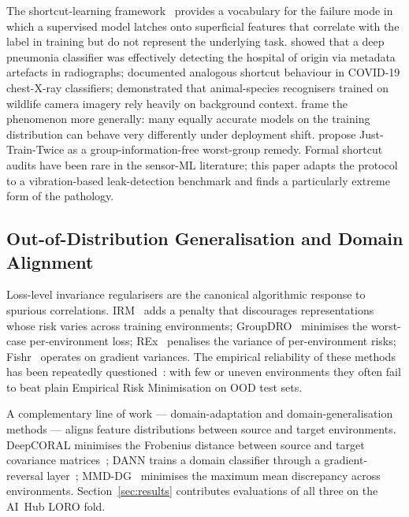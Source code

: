 \documentclass[3p,times,authoryear]{elsarticle}
\theoremstyle{remark}
\begin{document}
The shortcut-learning framework~\cite{geirhos2020shortcut}
provides a vocabulary for the failure mode in which a supervised
model latches onto superficial features that correlate with the
label in training but do not represent the underlying task.
\citet{zech2018pneumonia} showed that a deep pneumonia
classifier was effectively detecting the hospital of origin via
metadata artefacts in radiographs;
\citet{degrave2021covid} documented analogous shortcut behaviour
in COVID-19 chest-X-ray classifiers; \citet{beery2018terra}
demonstrated that animal-species recognisers trained on wildlife
camera imagery rely heavily on background context.
\citet{damour2022underspec} frame the phenomenon more generally:
many equally accurate models on the training distribution can
behave very differently under deployment shift.
\citet{liu2021jtt} propose Just-Train-Twice as a
group-information-free worst-group remedy. Formal shortcut
audits have been rare in the sensor-ML literature; this paper
adapts the protocol to a vibration-based leak-detection
benchmark and finds a particularly extreme form of the
pathology.

\subsection{Out-of-Distribution Generalisation and Domain Alignment}

Loss-level invariance regularisers are the canonical algorithmic
response to spurious correlations.
IRM~\cite{arjovsky2019irm} adds a penalty that discourages
representations whose risk varies across training environments;
GroupDRO~\cite{sagawa2020groupdro} minimises the worst-case
per-environment loss; REx~\cite{krueger2021rex} penalises the
variance of per-environment risks; Fishr~\cite{rame2022fishr}
operates on gradient variances. The empirical reliability of
these methods has been repeatedly
questioned~\cite{gulrajani2021dg,rosenfeld2021irm}: with few
or uneven environments they often fail to beat plain Empirical
Risk Minimisation on OOD test sets.

A complementary line of work --- domain-adaptation and
domain-generalisation methods --- aligns feature distributions
between source and target environments. DeepCORAL minimises the
Frobenius distance between source and target covariance
matrices~\cite{sun2016coral}; DANN trains a domain classifier
through a gradient-reversal layer~\cite{ganin2016dann};
MMD-DG~\cite{long2015dan,li2018mmddg,gretton2012mmd} minimises the maximum mean
discrepancy across environments. Section~\ref{sec:results}
contributes evaluations of all three on the AI~Hub LORO fold.
\end{document}
